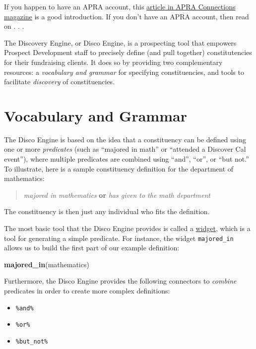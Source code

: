 \documentclass[]{book}
\newenvironment{Shaded}{\begin{snugshade}}{\end{snugshade}}
\newcommand{\KeywordTok}[1]{\textcolor[rgb]{0.13,0.29,0.53}{\textbf{#1}}}
\newcommand{\NormalTok}[1]{#1}
\providecommand{\tightlist}{%
  \setlength{\itemsep}{0pt}\setlength{\parskip}{0pt}}
\begin{document}
If you happen to have an APRA account, this \href{http://connections.aprahome.org/blog/building-the-discovery-engine}{article in APRA Connections magazine} is a good introduction. If you don't have an APRA account, then read on . . .

The Discovery Engine, or Disco Engine, is a prospecting tool that empowers Prospect Development staff to precisely define (and pull together) constitutencies for their fundraising clients. It does so by providing two complementary resources: a \emph{vocabulary and grammar} for specifying constituencies, and tools to facilitate \emph{discovery} of constituencies.

\hypertarget{vocabulary-and-grammar}{%
\section{Vocabulary and Grammar}\label{vocabulary-and-grammar}}

The Disco Engine is based on the idea that a constituency can be defined using one or more \emph{predicates} (such as ``majored in math'' or ``attended a Discover Cal event''), where multiple predicates are combined using ``and'', ``or'', or ``but not.'' To illustrate, here is a sample constituency definition for the department of mathematics:

\begin{quote}
\emph{majored in mathematics} \textbf{or} \emph{has given to the math department}
\end{quote}

The constituency is then just any individual who fits the definition.

The most basic tool that the Disco Engine provides is called a \protect\hyperlink{working-with-widgets}{widget}, which is a tool for generating a simple predicate. For instance, the widget \texttt{majored\_in} allows us to build the first part of our example definition:

\begin{Shaded}
\begin{Highlighting}[]
\KeywordTok{majored_in}\NormalTok{(mathematics)}
\end{Highlighting}
\end{Shaded}

Furthermore, the Disco Engine provides the following connectors to \emph{combine} predicates in order to create more complex definitions:

\begin{itemize}
\tightlist
\item
  \texttt{\%and\%}
\item
  \texttt{\%or\%}
\item
  \texttt{\%but\_not\%}
\end{itemize}
\end{document}
